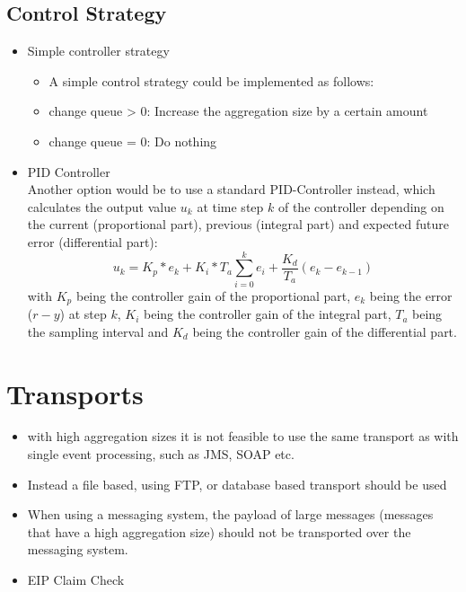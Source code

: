 \subsection{Control Strategy}

\begin{itemize}
	\item Simple controller strategy
	\begin{itemize}
		\item A simple control strategy could be implemented as follows:
		\item change queue > 0: Increase the aggregation size by a certain amount
		\item change queue = 0: Do nothing
	\end{itemize}
	\item PID Controller\\
	Another option would be to use a standard PID-Controller instead, which calculates the output value $u_k$ at time step $k$ of the controller depending on the current (proportional part), previous (integral part) and expected future error (differential part):
	\begin{displaymath}
	u_k=K_p*e_k+K_i*T_a\sum_{i=0}^k e_i+\frac{K_d}{T_a}(e_k-e_{k-1})
	\end{displaymath}
	with $K_p$ being the controller gain of the proportional part, $e_k$ being the error ($r-y$) at step $k$, $K_i$ being the controller gain of the integral part, $T_a$ being the sampling interval and $K_d$ being the controller gain of the differential part.
\end{itemize}

\section{Transports}
\label{sec:ch05_transports}

\begin{itemize}
	\item with high aggregation sizes it is not feasible to use the same transport as with single event processing, such as JMS, SOAP etc.
	\item Instead a file based, using FTP, or database based transport should be used
	\item When using a messaging system, the payload of large messages (messages that have a high aggregation size) should not be transported over the messaging system. 
	\item EIP Claim Check
\end{itemize}

